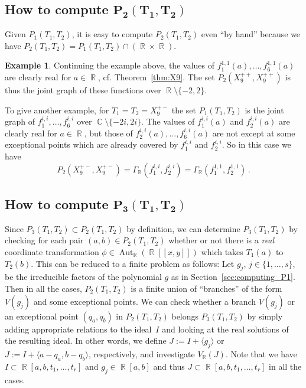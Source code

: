 \documentclass[noend]{amsproc}
\theoremstyle{definition}
\newtheorem{example}[theorem]{Example}
\DeclareMathOperator{\R}{\mathbb{R}}
\DeclareMathOperator{\C}{\mathbb{C}}
\DeclareMathOperator{\Aut}{Aut}
\begin{document}
\subsection{How to compute $\boldsymbol{P_2(T_1, T_2)}$}

Given $P_1(T_1, T_2)$, it is easy to compute $P_2(T_1, T_2)$ even ``by hand''
because we have $P_2(T_1, T_2) = P_1(T_1, T_2) \cap (\R \times \R)$.

\begin{example}\label{ex:P2}
Continuing the example above, the values of
$f_1^{1,1}(a), \ldots, f_6^{1,1}(a)$ are clearly real for $a \in \R$, cf.\@
Theorem~\ref{thm:X9}. The set $P_2(X_9^{++}, X_9^{++})$ is thus the joint graph
of these functions over $\R \setminus \{-2, 2\}$.

To give another example, for $T_1 = T_2 = X_9^{+-}$ the set $P_1(T_1, T_2)$ is
the joint graph of $f_1^{i,i}, \ldots, f_6^{i,i}$ over
$\C \setminus \{-2i, 2i\}$. The values of $f_1^{i,i}(a)$ and $f_2^{i,i}(a)$ are
clearly real for $a \in \R$, but those of $f_2^{i,i}(a), \ldots, f_6^{i,i}(a)$
are not except at some exceptional points which are already covered by
$f_1^{i,i}$ and $f_2^{i,i}$. So in this case we have
\[
P_2(X_9^{+-}, X_9^{+-}) = \Gamma_{\R} \left(f_1^{i,i}, f_2^{i,i}\right)
= \Gamma_{\R} \left(f_1^{1,1}, f_2^{1,1}\right) \,.
\]
\end{example}


\subsection{How to compute $\boldsymbol{P_3(T_1, T_2)}$}

Since $P_3(T_1, T_2) \subset P_2(T_1, T_2)$ by definition, we can determine
$P_3(T_1, T_2)$ by checking for each pair $(a,b) \in P_2(T_1, T_2)$ whether or
not there is a \emph{real} coordinate transformation
$\phi \in \Aut_{\R}(\R[[x,y]])$ which takes $T_1(a)$ to $T_2(b)$. This can be
reduced to a finite problem as follows: Let $g_j$, $j \in \{1,\ldots,s\}$, be
the irreducible factors of the polynomial $g$ as in
Section~\ref{sec:computing_P1}. Then in all the cases, $P_2(T_1, T_2)$ is a
finite union of ``branches'' of the form $V(g_j)$ and some exceptional points.
We can check whether a branch $V(g_j)$ or an exceptional point $(q_a, q_b)$ in
$P_2(T_1, T_2)$ belongs $P_3(T_1, T_2)$ by simply adding appropriate relations
to the ideal~$I$ and looking at the real solutions of the resulting ideal. In
other words, we define $J := I+\langle g_j \rangle$ or
$J := I+\langle a-q_a, b-q_b \rangle$, respectively, and investigate
$V_{\R}(J)$. Note that we have $I \subset \R[a,b,t_1,\ldots,t_r]$ and
$g_j \in \R[a,b]$ and thus $J \subset \R[a,b,t_1,\ldots,t_r]$ in all the cases.
\end{document}
